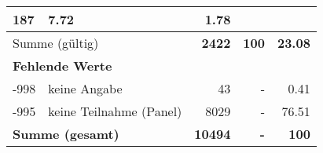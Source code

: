 \begin{longtable}{lXrrr}
       \num{187} &
       \num[round-mode=places,round-precision=2]{7,72} &
         \num[round-mode=places,round-precision=2]{1,78} \\
     \midrule
     \multicolumn{2}{l}{Summe (gültig)} &
       \textbf{\num{2422}} &
     \textbf{100} &
       \textbf{\num[round-mode=places,round-precision=2]{23,08}} \\
     \multicolumn{5}{l}{\textbf{Fehlende Werte}}\\
       -998 &
       keine Angabe &
         \num{43} &
        - &
         \num[round-mode=places,round-precision=2]{0,41} \\
       -995 &
       keine Teilnahme (Panel) &
         \num{8029} &
        - &
         \num[round-mode=places,round-precision=2]{76,51} \\
     \midrule
     \multicolumn{2}{l}{\textbf{Summe (gesamt)}} &
          \textbf{\num{10494}} &
        \textbf{-} &
        \textbf{100} \\
     \bottomrule
     \end{longtable}
     
